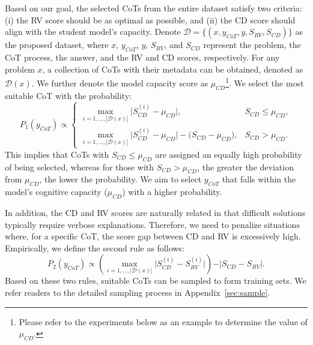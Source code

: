\documentclass{article}
\begin{document}
Based on our goal, the selected CoTs from the entire dataset satisfy two criteria: (i) the RV score should be as optimal as possible, and (ii) the CD score should align with the student model's capacity. Denote $\mathcal{D} = \{(x, y_{CoT}, y, S_{RV}, S_{CD})\}$ as the proposed dataset, where $x$, $y_{CoT}$, $y$, $S_{RV}$, and $S_{CD}$ represent the problem, the CoT process, the answer, and the RV and CD scores, respectively. For any problem $x$, a collection of CoTs with their metadata can be obtained, denoted as $\mathcal{D}(x)$. We further denote the model capacity score as $\mu_{CD}$\footnote{Please refer to the experiments below as an example to determine the value of $\mu_{CD}$.}. We select the most suitable CoT with the probability:
\begin{equation}
P_1(y_{CoT}) \propto 
\begin{cases}
\max_{i=1,\ldots,|\mathcal{D}(x)|}\bigl\lvert S^{(i)}_{CD}-\mu_{CD}\bigr\rvert, & S_{CD}\le\mu_{CD},\\[0.5em]
\max_{i=1,\ldots,|\mathcal{D}(x)|}\bigl\lvert S^{(i)}_{CD}-\mu_{CD}\bigr\rvert - \bigl(S_{CD}-\mu_{CD}\bigr), & S_{CD}>\mu_{CD}.
\end{cases}
\end{equation}
This implies that CoTs with $S_{CD}\le\mu_{CD}$ are assigned an equally high probability of being selected, whereas for those with $S_{CD}>\mu_{CD}$, the greater the deviation from $\mu_{CD}$, the lower the probability. We aim to select \(y_{CoT}\) that falls within the model’s cognitive capacity ($\mu_{CD}$) with a higher probability.

In addition, the CD and RV scores are naturally related in that difficult solutions typically require verbose explanations. Therefore, we need to penalize situations where, for a specific CoT, the score gap between CD and RV is excessively high. Empirically, we define the second rule as follows:
\begin{equation}
    P_2(y_{CoT}) \propto \left(\max_{i=1,\ldots,\vert\mathcal{D}(x)\vert}\vert S^{(i)}_{CD}-S^{(i)}_{RV}\vert\right) - \vert S_{CD}-S_{RV}\vert.
\end{equation}
Based on these two rules, suitable CoTs can be sampled to form training sets. We refer readers to the detailed sampling process in Appendix~\ref{sec:sample}.
\end{document}
